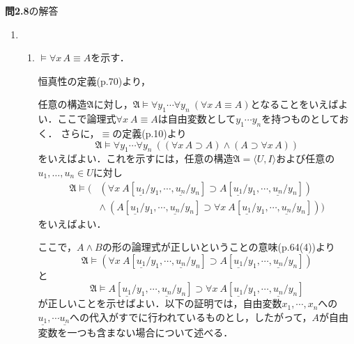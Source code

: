 \documentclass[11pt,dvipdfmx]{jreport}
\begin{document}
\par
\vspace{5mm}

\noindent \textbf{問2.8}の解答 
\begin{enumerate}
 \item 
  \begin{enumerate}
   \item $\models \forall x \, A \equiv A$を示す．
    \par \noindent 
    恒真性の定義(p.70)より，
    \par \noindent 
    任意の構造$\mathfrak{A}$に対し，$\mathfrak{A} \models \forall y_{1} \cdots \forall y_{n} \ (\forall x \, A \equiv A)$となることをいえばよい．ここで論理式$\forall x \ A \equiv A$は自由変数として$y_{1} \cdots y_{n}$を持つものとしておく．
さらに，$\equiv$の定義(p.10)より
    \begin{equation*}
     \mathfrak{A} \models \forall y_{1} \cdots \forall y_{n} \ ((\forall x \, A \supset A) \land (A \supset \forall x \, A))
    \end{equation*}
    をいえばよい．これを示すには，任意の構造$\mathfrak{A} = \langle U, I \rangle$および任意の$u_{1}, \dots, u_{n} \in U$に対し
    \begin{align*}
     \mathfrak{A} \models ( & (\forall x \ A[ \underline{u_{1}} / y_{1}, \cdots , \underline{u_{n}} / y_{n}] \supset A[\underline{u_{1}}/y_{1}, \cdots , \underline{u_{n}}/y_{n}]) \\
     & \land \ (A[\underline{u_{1}}/y_{1}, \cdots , \underline{u_{n}}/y_{n}] \supset \forall x \ A[ \underline{u_{1}} / y_{1}, \cdots , \underline{u_{n}} / y_{n}]))
    \end{align*}
をいえばよい．
    \par \noindent
    ここで，$A \land B$の形の論理式が正しいということの意味(p.64(4))より
    \begin{equation*}
     \mathfrak{A} \models (\forall x \ A[ \underline{u_{1}} / y_{1}, \cdots , \underline{u_{n}} / y_{n}] \supset A[\underline{u_{1}}/y_{1}, \cdots , \underline{u_{n}}/y_{n}])
    \end{equation*}
    と
    \begin{equation*}
     \mathfrak{A} \models A[\underline{u_{1}}/y_{1}, \cdots , \underline{u_{n}}/y_{n}] \supset \forall x \ A[ \underline{u_{1}} / y_{1}, \cdots , \underline{u_{n}} / y_{n}]
    \end{equation*}
    が正しいことを示せばよい．以下の証明では，自由変数$x_{1}, \cdots, x_{n}$への$\underline{u_{1}}, \cdots \underline{u_{n}}$への代入がすでに行われているものとし，したがって，$A$が自由変数を一つも含まない場合について述べる．

\end{enumerate}
\end{enumerate}
\end{document}
